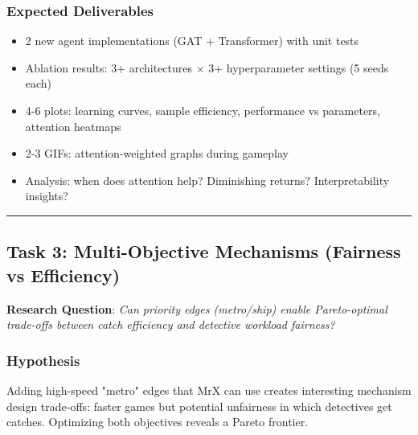 \documentclass[11pt,a4paper]{scrartcl}
\newcommand{\sectiondivider}{%
  \vspace{0.2em}%
  \noindent\textcolor{rulecolor}{\rule{0.3\textwidth}{0.4pt}}%
  \vspace{0.3em}%
}
\begin{document}
\subsubsection*{Expected Deliverables}
\begin{itemize}[leftmargin=1.2em]
    \item 2 new agent implementations (GAT + Transformer) with unit tests
    \item Ablation results: 3+ architectures $\times$ 3+ hyperparameter settings (5 seeds each)
    \item 4-6 plots: learning curves, sample efficiency, performance vs parameters, attention heatmaps
    \item 2-3 GIFs: attention-weighted graphs during gameplay
    \item Analysis: when does attention help? Diminishing returns? Interpretability insights?
\end{itemize}

\sectiondivider

\subsection*{Task 3: Multi-Objective Mechanisms (Fairness vs Efficiency)}
\textbf{Research Question}: \textit{Can priority edges (metro/ship) enable Pareto-optimal trade-offs between catch efficiency and detective workload fairness?}

\subsubsection*{Hypothesis}
Adding high-speed "metro" edges that MrX can use creates interesting mechanism design trade-offs: faster games but potential unfairness in which detectives get catches. Optimizing both objectives reveals a Pareto frontier.
\end{document}
